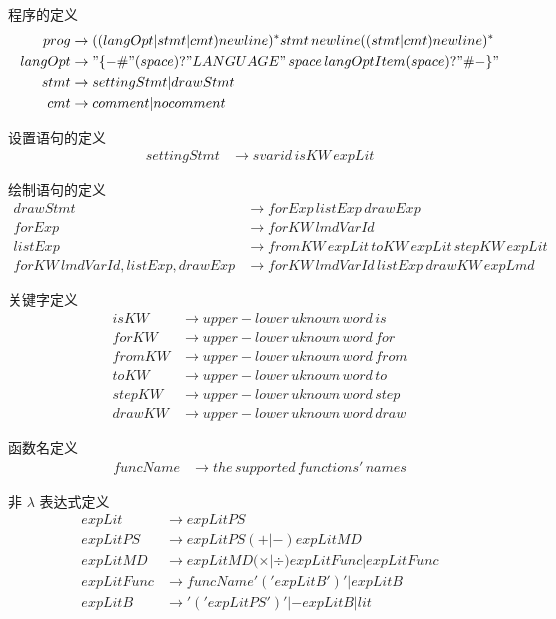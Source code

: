 \documentclass{ctexart}
\begin{document}
程序的定义
\begin{align*}
prog &\rightarrow ((langOpt|stmt|cmt)newline)^*stmt\,newline((stmt|cmt)newline)^* \\
langOpt &\rightarrow "\{-\#"(space)?"LANGUAGE"\,space\,langOptItem(space)?"\#-\}" \\
stmt &\rightarrow settingStmt|drawStmt \\
cmt &\rightarrow comment|nocomment
\end{align*}

设置语句的定义
\begin{align*}
settingStmt &\rightarrow svarid\,isKW\,expLit
\end{align*}

绘制语句的定义
\begin{align*}
drawStmt &\rightarrow forExp\,listExp\,drawExp \\
forExp &\rightarrow forKW\,lmdVarId \\
listExp &\rightarrow fromKW\,expLit\,toKW\,expLit\,stepKW\,expLit \\
forKW\,lmdVarId,listExp,drawExp &\rightarrow forKW\,lmdVarId\,listExp\,drawKW\,expLmd
\end{align*}

关键字定义
\begin{align*}
isKW &\rightarrow \mathit{upper-lower\,uknown\,word\,is} \\
forKW &\rightarrow \mathit{upper-lower\,uknown\,word\,for} \\
fromKW &\rightarrow \mathit{upper-lower\,uknown\,word\,from} \\
toKW &\rightarrow \mathit{upper-lower\,uknown\,word\,to} \\
stepKW &\rightarrow \mathit{upper-lower\,uknown\,word\,step} \\
drawKW &\rightarrow \mathit{upper-lower\,uknown\,word\,draw}
\end{align*}

函数名定义
\begin{align*}
funcName &\rightarrow \mathit{the\,supported\,functions'\,names}
\end{align*}

非 $\lambda$ 表达式定义
\begin{align*}
expLit &\rightarrow expLitPS \\
expLitPS &\rightarrow expLitPS (+|-) expLitMD \\
expLitMD &\rightarrow expLitMD (\times|\div) expLitFunc | expLitFunc \\
expLitFunc &\rightarrow funcName'('expLitB')' | expLitB \\
expLitB &\rightarrow '('expLitPS')' | -expLitB | lit
\end{align*}
\end{document}
